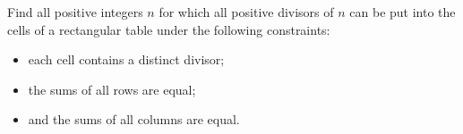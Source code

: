 Find all positive integers 
$n$
 for which all positive divisors of 
$n$
 can be put into the cells of a rectangular table under the following constraints:

\begin{itemize}
    \item each cell contains a distinct divisor;

    \item the sums of all rows are equal;
    
    \item and the sums of all columns are equal.
\end{itemize}
